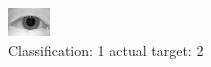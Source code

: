 \begin{figure}[h!]
\begin{center}
\includegraphics[width=0.60\columnwidth]{figures/ID1021_class_1_target_2.png}
\end{center}
\caption{ Classification: 1 actual target: 2}
\label{fig:ID1021_class_1_target_2}
\end{figure}
